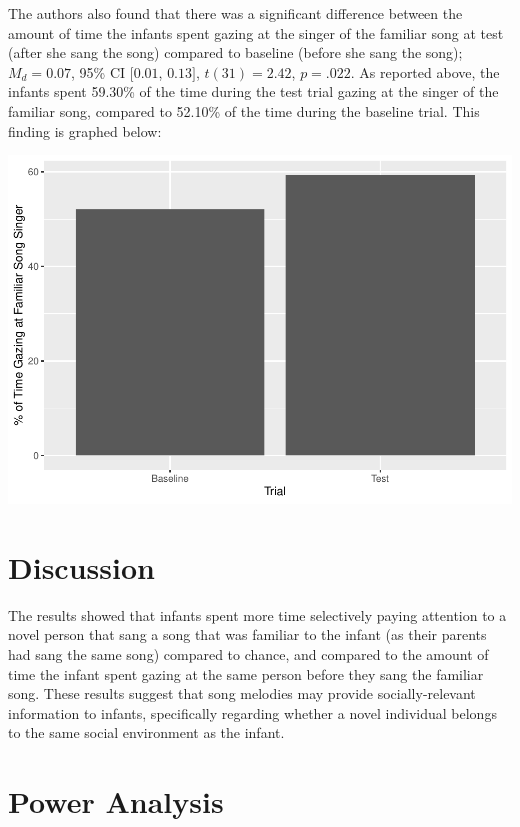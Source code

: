 \documentclass[
  english,
  man]{apa6}
\begin{document}
The authors also found that there was a significant difference between the amount of time the infants spent gazing at the singer of the familiar song at test (after she sang the song) compared to baseline (before she sang the song);\(M_d = 0.07\), 95\% CI \([0.01\), \(0.13]\), \(t(31) = 2.42\), \(p = .022\). As reported above, the infants spent 59.30\% of the time during the test trial gazing at the singer of the familiar song, compared to 52.10\%
of the time during the baseline trial. This finding is graphed below:

\includegraphics{APAReport_files/figure-latex/unnamed-chunk-5-1.pdf}

\hypertarget{discussion}{%
\section{Discussion}\label{discussion}}

The results showed that infants spent more time selectively paying attention to a novel person that sang a song that was familiar to the infant (as their parents had sang the same song) compared to chance, and compared to the amount of time the infant spent gazing at the same person before they sang the familiar song. These results suggest that song melodies may provide socially-relevant information to infants, specifically regarding whether a novel individual belongs to the same social environment as the infant.

\hypertarget{power-analysis}{%
\section{Power Analysis}\label{power-analysis}}
\end{document}

